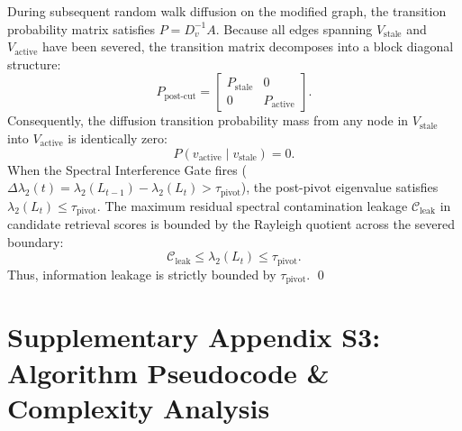 \documentclass[11pt]{article}
\begin{document}
During subsequent random walk diffusion on the modified graph, the transition probability matrix satisfies $P = D_v^{-1} A$. Because all edges spanning $V_{\text{stale}}$ and $V_{\text{active}}$ have been severed, the transition matrix decomposes into a block diagonal structure:
\begin{equation}
  P_{\text{post-cut}} = \begin{bmatrix} P_{\text{stale}} & 0 \\ 0 & P_{\text{active}} \end{bmatrix}.
\end{equation}
Consequently, the diffusion transition probability mass from any node in $V_{\text{stale}}$ into $V_{\text{active}}$ is identically zero:
\begin{equation}
  P(v_{\text{active}} \mid v_{\text{stale}}) = 0.
\end{equation}
When the Spectral Interference Gate fires ($\Delta \lambda_2(t) = \lambda_2(L_{t-1}) - \lambda_2(L_t) > \tau_{\text{pivot}}$), the post-pivot eigenvalue satisfies $\lambda_2(L_t) \le \tau_{\text{pivot}}$. The maximum residual spectral contamination leakage $\mathcal{C}_{\text{leak}}$ in candidate retrieval scores is bounded by the Rayleigh quotient across the severed boundary:
\begin{equation}
  \mathcal{C}_{\text{leak}} \le \lambda_2(L_t) \le \tau_{\text{pivot}}.
\end{equation}
Thus, information leakage is strictly bounded by $\tau_{\text{pivot}}$. \qed

\section{Supplementary Appendix S3: Algorithm Pseudocode \& Complexity Analysis}
\end{document}
